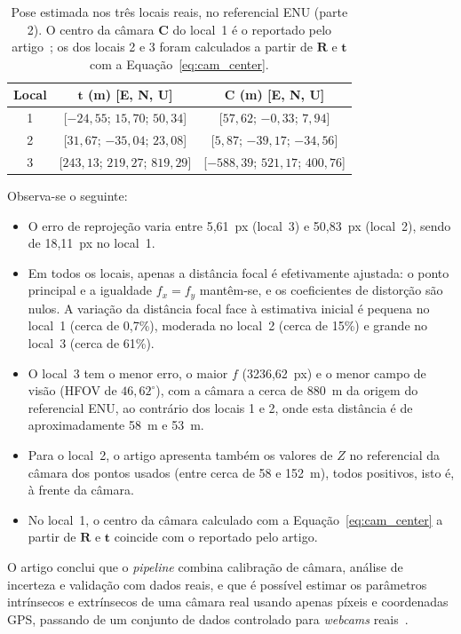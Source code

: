\begin{table}[htbp]
\centering
\caption{Pose estimada nos três locais reais, no referencial ENU (parte 2). O centro da câmara $\mathbf{C}$ do local~1 é o reportado pelo artigo~\cite{sunkara2025}; os dos locais 2 e 3 foram calculados a partir de $\mathbf{R}$ e $\mathbf{t}$ com a Equação~\eqref{eq:cam_center}.}
\label{tab:sunkara_reais_pose}
\small
\begin{tabular}{ccc}
\hline
\textbf{Local} & \textbf{$\mathbf{t}$ (m) [E, N, U]} & \textbf{$\mathbf{C}$ (m) [E, N, U]} \\
\hline
1 & [$-24{,}55$; $15{,}70$; $50{,}34$] & [$57{,}62$; $-0{,}33$; $7{,}94$] \\
2 & [$31{,}67$; $-35{,}04$; $23{,}08$] & [$5{,}87$; $-39{,}17$; $-34{,}56$] \\
3 & [$243{,}13$; $219{,}27$; $819{,}29$] & [$-588{,}39$; $521{,}17$; $400{,}76$] \\
\hline
\end{tabular}
\end{table}

Observa-se o seguinte:

\begin{itemize}
    \item O erro de reprojeção varia entre 5,61~px (local~3) e 50,83~px (local~2), sendo de 18,11~px no local~1.
    \item Em todos os locais, apenas a distância focal é efetivamente ajustada: o ponto principal e a igualdade $f_x=f_y$ mantêm-se, e os coeficientes de distorção são nulos. A variação da distância focal face à estimativa inicial é pequena no local~1 (cerca de 0,7\%), moderada no local~2 (cerca de 15\%) e grande no local~3 (cerca de 61\%).
    \item O local~3 tem o menor erro, o maior $f$ (3236,62~px) e o menor campo de visão (HFOV de $46{,}62^{\circ}$), com a câmara a cerca de 880~m da origem do referencial ENU, ao contrário dos locais 1 e 2, onde esta distância é de aproximadamente 58~m e 53~m.
    \item Para o local~2, o artigo apresenta também os valores de $Z$ no referencial da câmara dos pontos usados (entre cerca de 58 e 152~m), todos positivos, isto é, à frente da câmara.
    \item No local~1, o centro da câmara calculado com a Equação~\eqref{eq:cam_center} a partir de $\mathbf{R}$ e $\mathbf{t}$ coincide com o reportado pelo artigo.
\end{itemize}

O artigo conclui que o \textit{pipeline} combina calibração de câmara, análise de incerteza e validação com dados reais, e que é possível estimar os parâmetros intrínsecos e extrínsecos de uma câmara real usando apenas píxeis e coordenadas GPS, passando de um conjunto de dados controlado para \textit{webcams} reais~\cite{sunkara2025}.

